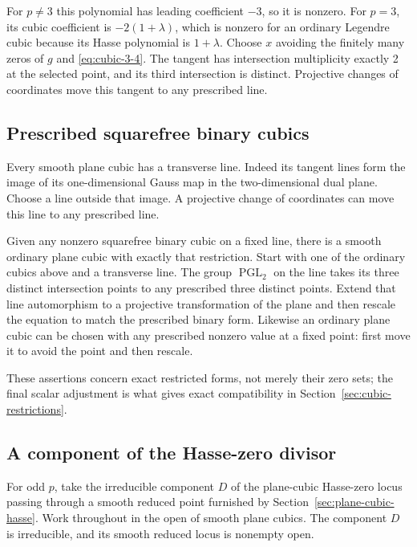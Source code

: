\documentclass[11pt]{article}
\begin{document}
For \(p\ne3\) this polynomial has leading coefficient \(-3\), so it is nonzero. For \(p=3\), its cubic coefficient is \(-2(1+\lambda)\), which is nonzero for an ordinary Legendre cubic because its Hasse polynomial is \(1+\lambda\). Choose \(x\) avoiding the finitely many zeros of \(g\) and \eqref{eq:cubic-3-4}. The tangent has intersection multiplicity exactly 2 at the selected point, and its third intersection is distinct. Projective changes of coordinates move this tangent to any prescribed line.

\subsection{Prescribed squarefree binary cubics}\label{sec:plane-cubic-restriction}

Every smooth plane cubic has a transverse line. Indeed its tangent lines form the image of its one-dimensional Gauss map in the two-dimensional dual plane. Choose a line outside that image. A projective change of coordinates can move this line to any prescribed line.

Given any nonzero squarefree binary cubic on a fixed line, there is a smooth ordinary plane cubic with exactly that restriction. Start with one of the ordinary cubics above and a transverse line. The group \(\operatorname{PGL}_2\) on the line takes its three distinct intersection points to any prescribed three distinct points. Extend that line automorphism to a projective transformation of the plane and then rescale the equation to match the prescribed binary form. Likewise an ordinary plane cubic can be chosen with any prescribed nonzero value at a fixed point: first move it to avoid the point and then rescale.

These assertions concern exact restricted forms, not merely their zero sets; the final scalar adjustment is what gives exact compatibility in Section~\ref{sec:cubic-restrictions}.

\subsection{A component of the Hasse-zero divisor}\label{sec:plane-cubic-component}

For odd \(p\), take the irreducible component \(D\) of the plane-cubic Hasse-zero locus passing through a smooth reduced point furnished by Section~\ref{sec:plane-cubic-hasse}. Work throughout in the open of smooth plane cubics. The component \(D\) is irreducible, and its smooth reduced locus is nonempty open.
\end{document}
